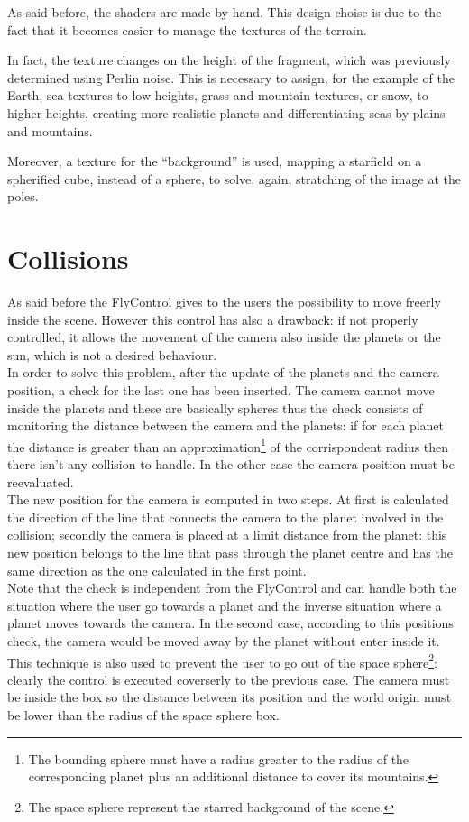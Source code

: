 \documentclass[paper=a4, fontsize=11pt]{scrartcl} %
\numberwithin{equation}{section} %
\numberwithin{figure}{section} %
\numberwithin{table}{section} %
\theoremstyle{definition}
\begin{document}
As said before, the shaders are made by hand. This design choise is due to
the fact that it becomes easier to manage the textures of the terrain.

In fact, the texture changes on the height of the fragment, which was previously
determined using Perlin noise. This is necessary to assign, for the example
of the Earth, sea textures to low
heights, grass and mountain textures, or snow, to higher heights, creating
more realistic planets and differentiating seas by plains and mountains.

Moreover, a texture for the ``background'' is used, mapping a starfield on a
spherified cube, instead of a sphere, to solve, again, stratching of the image at the poles.


\section{Collisions}

As said before the FlyControl gives to the users the possibility to move freerly inside the scene. However this control has also a drawback: if not properly controlled, it allows the movement of the camera also inside the planets or the sun, which is not a desired behaviour.\\
In order to solve this problem, after the update of the planets and the camera position, a check for the last one has been inserted. The camera cannot move inside the planets and these are basically spheres thus the check consists of monitoring the distance between the camera and the planets: if for each planet the distance is greater than an approximation\footnote{The bounding sphere must have a radius greater to the radius of the corresponding planet plus an additional distance to cover its mountains.} of the corrispondent radius then there isn't any collision to handle. In the other case the camera position must be reevaluated.\\
The new position for the camera is computed in two steps. At first is calculated the direction of the line that connects the camera to the planet involved in the collision; secondly the camera is placed at a limit distance from the planet: this new position belongs to the line that pass through the planet centre and has the same direction as the one calculated in the first point.\\
Note that the check is independent from the FlyControl and can handle both the situation where the user go towards a planet and the inverse situation where a planet moves towards the camera. In the second case, according to this positions check, the camera would be moved away by the planet without enter inside it.\\
This technique is also used to prevent the user to go out of the space sphere\footnote{The space sphere represent the starred background of the scene.}: clearly the control is executed coverserly to the previous case. The camera must be inside the box so the distance between its position and the world origin must be lower than the radius of the space sphere box.
\end{document}
